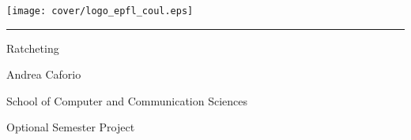 
%        




\newcommand{\logoepfl}[0]{
  \begin{center}
    \texttt{[image: cover/logo\_epfl\_coul.eps]}
  \end{center}
  \vspace{0.3cm}
  \hrule
}
\newcommand{\logolasec}[0]{
  \vspace{1cm}
  \hrule
  \begin{center}
    \texttt{[image: cover/logo\_lasec\_coul.eps]}
  \end{center}
}
\newcommand{\project}[1]{
  \begin{center}
    \large{#1}
  \end{center}
  \vspace{1cm}
}
\newcommand{\department}[1]{
  \begin{center}
    \large{#1}
  \end{center}
}
\newcommand{\supervisor}[3]{
  \begin{center}
    \begin{normalsize}{
        \bfseries #1}\\#2\\#3
    \end{normalsize}
  \end{center}
}
\renewcommand{\author}[1]{
  \begin{center}
    \Large{#1}
  \end{center}
  \vspace{0.5cm}
}
\renewcommand{\title}[1]{
  \vspace{3cm}
  \begin{center}
    \huge{#1}
  \end{center}
  \vspace{1.7cm}
}
\renewcommand{\date}[2]{
  \begin{center}
    \normalsize{#1 #2}
  \end{center}
  \vspace{0.5cm}
}


\thispagestyle{empty}


\logoepfl

\title{Ratcheting}

\author{Andrea Caforio}
\department{School of Computer and Communication Sciences}
\project{Optional Semester Project}

